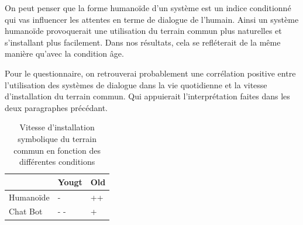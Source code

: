 \documentclass{article}
\begin{document}
On peut penser que la forme humanoïde d'un système est un indice conditionné qui vas influencer les attentes en terme de dialogue de l'humain. Ainsi un système humanoïde provoquerait une utilisation du terrain commun plus naturelles et s'installant plus facilement. Dans nos résultats, cela se refléterait de la même manière qu'avec la condition âge.

Pour le questionnaire, on retrouverai probablement une corrélation positive entre l'utilisation des systèmes de dialogue dans la vie quotidienne et la vitesse d'installation du terrain commun. Qui appuierait l'interprétation faites dans les deux paragraphes précédant.

\begin{table}[!htbp]
    \centering
    \begin{tabular}{|l|l|l|}
        \hline
        ~ & Yougt & Old \\ \hline
        Humanoïde & - & ++ \\ \hline
        Chat Bot & - - & + \\ \hline
    \end{tabular}
    \caption{Vitesse d'installation symbolique du terrain commun en fonction des différentes conditions}
    \label{table1}
\end{table}
\end{document}
